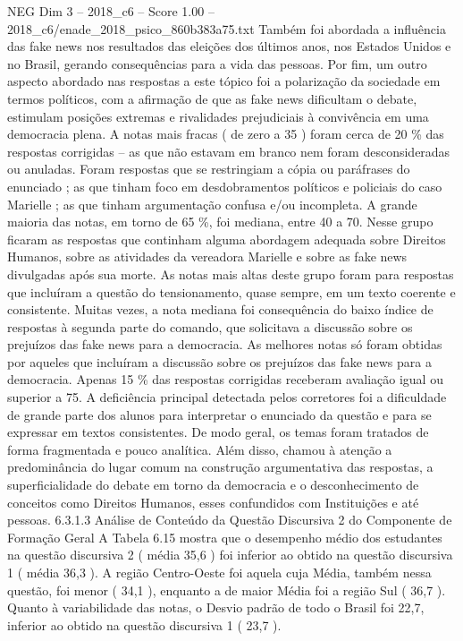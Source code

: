 \begin{textsample}{NEG Dim 3 – 2018\_c6 – Score 1.00 – 2018\_c6/enade\_2018\_psico\_860b383a75.txt}
Também foi abordada a influência das fake news nos resultados das eleições dos últimos anos, nos Estados Unidos e no Brasil, gerando consequências para a vida das pessoas.
Por fim, um outro aspecto abordado nas respostas a este tópico foi a polarização da sociedade em termos políticos, com a afirmação de que as fake news dificultam o debate, estimulam posições extremas e rivalidades prejudiciais à convivência em uma democracia plena.
A notas mais fracas ( de zero a 35 ) foram cerca de 20 \% das respostas corrigidas – as que não estavam em branco nem foram desconsideradas ou anuladas.
Foram respostas que se restringiam a cópia ou paráfrases do enunciado ; as que tinham foco em desdobramentos políticos e policiais do caso Marielle ; as que tinham argumentação confusa e/ou incompleta.
A grande maioria das notas, em torno de 65 \%, foi mediana, entre 40 a 70.
Nesse grupo ficaram as respostas que continham alguma abordagem adequada sobre Direitos Humanos, sobre as atividades da vereadora Marielle e sobre as fake news divulgadas após sua morte.
As notas mais altas deste grupo foram para respostas que incluíram a questão do tensionamento, quase sempre, em um texto coerente e consistente.
Muitas vezes, a nota mediana foi consequência do baixo índice de respostas à segunda parte do comando, que solicitava a discussão sobre os prejuízos das fake news para a democracia.
As melhores notas só foram obtidas por aqueles que incluíram a discussão sobre os prejuízos das fake news para a democracia.
Apenas 15 \% das respostas corrigidas receberam avaliação igual ou superior a 75.
A deficiência principal detectada pelos corretores foi a dificuldade de grande parte dos alunos para interpretar o enunciado da questão e para se expressar em textos consistentes.
De modo geral, os temas foram tratados de forma fragmentada e pouco analítica.
Além disso, chamou à atenção a predominância do lugar comum na construção argumentativa das respostas, a superficialidade do debate em torno da democracia e o desconhecimento de conceitos como Direitos Humanos, esses confundidos com Instituições e até pessoas. 6.3.1.3 Análise de Conteúdo da Questão Discursiva 2 do Componente de Formação Geral A Tabela 6.15 mostra que o desempenho médio dos estudantes na questão discursiva 2 ( média 35,6 ) foi inferior ao obtido na questão discursiva 1 ( média 36,3 ).
A região Centro-Oeste foi aquela cuja Média, também nessa questão, foi menor ( 34,1 ), enquanto a de maior Média foi a região Sul ( 36,7 ).
Quanto à variabilidade das notas, o Desvio padrão de todo o Brasil foi 22,7, inferior ao obtido na questão discursiva 1 ( 23,7 ).

\end{textsample}
